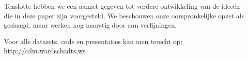 \documentclass[11pt]{article}
\begin{document}
Tenslotte hebben we een aanzet gegeven tot verdere ontwikkeling van de idee\"en
die in deze paper zijn voorgesteld. We beschouwen onze oorspronkelijke opzet als
geslaagd, maar werken nog naarstig door aan verfijningen.

Voor alle datasets, code en presentaties kan men terecht op: \url{http://cdm.wardschodts.ws}


\nocite{*}

\end{document}

